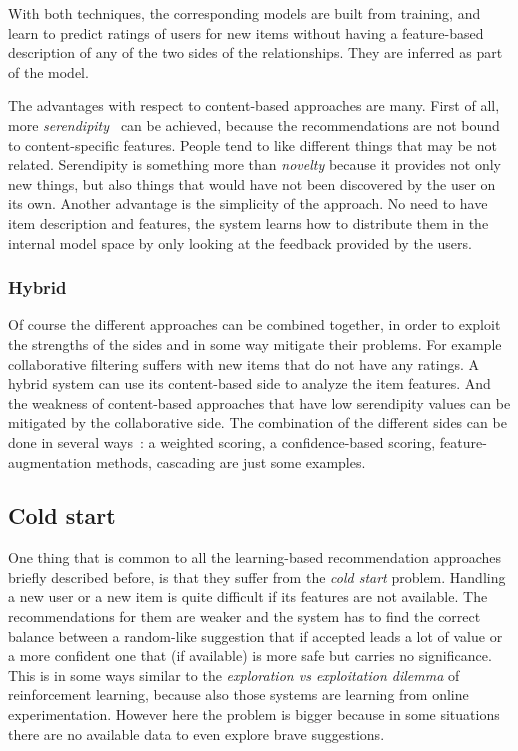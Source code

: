 With both techniques, the corresponding models are built from training, and learn to predict ratings of users for new items without having a feature-based description of any of the two sides of the relationships. They are inferred as part of the model.

The advantages with respect to content-based approaches are many. First of all, more \textit{serendipity~\cite{roberts1989serendipity}} can be achieved, because the recommendations are not bound to content-specific features. People tend to like different things that may be not related. Serendipity is something more than \textit{novelty} because it provides not only new things, but also things that would have not been discovered by the user on its own. Another advantage is the simplicity of the approach. No need to have item description and features, the system learns how to distribute them in the internal model space by only looking at the feedback provided by the users.

\subsubsection{Hybrid}
Of course the different approaches can be combined together, in order to exploit the strengths of the sides and in some way mitigate their problems. For example collaborative filtering suffers with new items that do not have any ratings. A hybrid system can use its content-based side to analyze the item features. And the weakness of content-based approaches that have low serendipity values can be mitigated by the collaborative side. The combination of the different sides can be done in several ways~\cite{burke2007hybrid}: a weighted scoring, a confidence-based scoring, feature-augmentation methods, cascading are just some examples.

\subsection{Cold start}
\label{soaColdStart}

One thing that is common to all the learning-based recommendation approaches briefly described before, is that they suffer from the \textit{cold start} problem. Handling a new user or a new item is quite difficult if its features are not available. The recommendations for them are weaker and the system has to find the correct balance between a random-like suggestion that if accepted leads a lot of value or a more confident one that (if available) is more safe but carries no significance. This is in some ways similar to the \textit{exploration vs exploitation dilemma} of reinforcement learning, because also those systems are learning from online experimentation. However here the problem is bigger because in some situations there are no available data to even explore brave suggestions.

